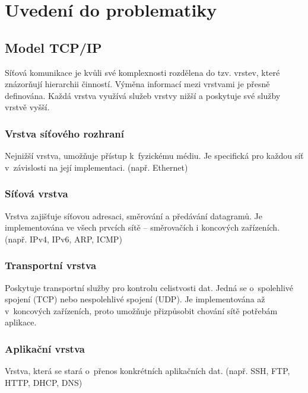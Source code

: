 \documentclass[11pt, a4paper, titlepage]{article}
\begin{document}
\newpage


\section{Uvedení do problematiky}

\subsection{Model TCP/IP}

Síťová komunikace je kvůli své komplexnosti rozdělena do tzv. vrstev, které znázorňují hierarchii činností. Výměna informací mezi vrstvami je přesně definována. Každá vrstva využívá služeb vrstvy nižší a poskytuje své služby vrstvě vyšší.

\subsubsection{Vrstva síťového rozhraní}

Nejnižší vrstva, umožňuje přístup k~fyzickému médiu. Je specifická pro každou síť v~závislosti na její implementaci. (např. Ethernet)

\subsubsection{Síťová vrstva}

Vrstva zajišťuje síťovou adresaci, směrování a předávání datagramů. Je implementována ve všech prvcích sítě -- směrovačích i koncových zařízeních. (např. IPv4, IPv6, ARP, ICMP)

\subsubsection{Transportní vrstva}

Poskytuje transportní služby pro kontrolu celistvosti dat. Jedná se o~spolehlivé spojení (TCP) nebo nespolehlivé spojení (UDP). Je implementována až v~koncových zařízeních, proto umožňuje přizpůsobit chování sítě potřebám aplikace.

\subsubsection{Aplikační vrstva}
Vrstva, která se stará o~přenos konkrétních aplikačních dat. (např. SSH, FTP, HTTP, DHCP, DNS)
\end{document}
